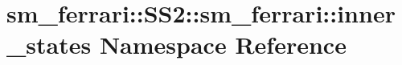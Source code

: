 \hypertarget{namespacesm__ferrari_1_1SS2_1_1sm__ferrari_1_1inner__states}{}\section{sm\+\_\+ferrari\+:\+:S\+S2\+:\+:sm\+\_\+ferrari\+:\+:inner\+\_\+states Namespace Reference}
\label{namespacesm__ferrari_1_1SS2_1_1sm__ferrari_1_1inner__states}
